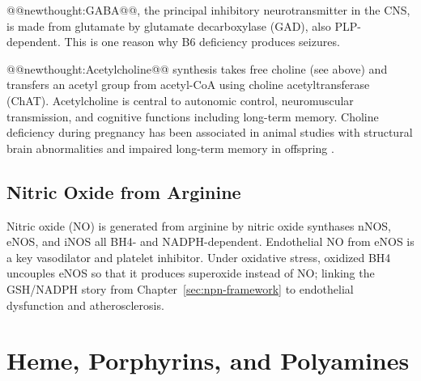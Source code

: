 \documentclass{tufte-handout}
\makeatletter
\def\newthought#1{@@newthought:#1@@}
\makeatother
\begin{document}
\newthought{GABA}, the principal inhibitory neurotransmitter in the CNS, is made from glutamate by glutamate decarboxylase (GAD), also PLP-dependent. This is one reason why B6 deficiency produces seizures.

\newthought{Acetylcholine} synthesis takes free choline (see above) and transfers an acetyl group from acetyl-CoA using choline acetyltransferase (ChAT). Acetylcholine is central to autonomic control, neuromuscular transmission, and cognitive functions including long-term memory. Choline deficiency during pregnancy has been associated in animal studies with structural brain abnormalities and impaired long-term memory in offspring \citep{craciunescuDietaryCholineReverses2010}.

\subsection{Nitric Oxide from Arginine}
Nitric oxide (NO) is generated from arginine by nitric oxide synthases nNOS, eNOS, and iNOS all BH4- and NADPH-dependent. Endothelial NO from eNOS is a key vasodilator and platelet inhibitor. Under oxidative stress, oxidized BH4 uncouples eNOS so that it produces superoxide instead of NO; linking the GSH/NADPH story from Chapter~\ref{sec:npn-framework} to endothelial dysfunction and atherosclerosis.

\section{Heme, Porphyrins, and Polyamines}\label{sec:heme-poly}
\end{document}
